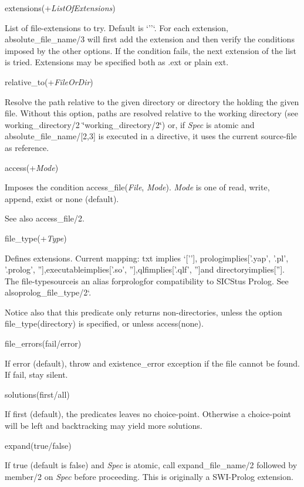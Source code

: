 \begin{DoxyItemize}
\item extensions(+{\itshape List\+Of\+Extensions})

List of file-\/extensions to try. Default is `''`. For each extension, absolute\+\_\+file\+\_\+name/3 will first add the extension and then verify the conditions imposed by the other options. If the condition fails, the next extension of the list is tried. Extensions may be specified both as {\ttfamily .ext} or plain {\ttfamily ext}.
\item relative\+\_\+to(+{\itshape File\+Or\+Dir})

Resolve the path relative to the given directory or directory the holding the given file. Without this option, paths are resolved relative to the working directory (see working\+\_\+directory/2 \char`\"{}working\+\_\+directory/2\char`\"{}) or, if {\itshape Spec} is atomic and {\ttfamily absolute\+\_\+file\+\_\+name/\mbox{[}2,3\mbox{]}} is executed in a directive, it uses the current source-\/file as reference.
\item access(+{\itshape Mode})

Imposes the condition access\+\_\+file({\itshape File}, {\itshape Mode}). {\itshape Mode} is one of {\ttfamily read}, {\ttfamily write}, {\ttfamily append}, {\ttfamily exist} or {\ttfamily none} (default).

See also {\ttfamily access\+\_\+file/2}.
\item file\+\_\+type(+{\itshape Type})

Defines extensions. Current mapping\+: {\ttfamily txt} implies `\mbox{[}''\mbox{]}{\ttfamily , }prolog{\ttfamily implies}\mbox{[}'.yap', '.pl', '.prolog', ''\mbox{]}{\ttfamily ,}executable{\ttfamily  implies}\mbox{[}'.so', ''\mbox{]}{\ttfamily ,}qlf{\ttfamily implies}\mbox{[}'.qlf', ''\mbox{]}{\ttfamily and }directory{\ttfamily implies}\mbox{[}''\mbox{]}{\ttfamily . The file-\/type}source{\ttfamily  is an alias for}prolog{\ttfamily for compatibility to S\+I\+C\+Stus Prolog. See also}prolog\+\_\+file\+\_\+type/2`.

Notice also that this predicate only returns non-\/directories, unless the option {\ttfamily file\+\_\+type(directory)} is specified, or unless {\ttfamily access(none)}.
\item file\+\_\+errors({\ttfamily fail}/{\ttfamily error})

If {\ttfamily error} (default), throw and {\ttfamily existence\+\_\+error} exception if the file cannot be found. If {\ttfamily fail}, stay silent.
\item solutions({\ttfamily first}/{\ttfamily all})

If {\ttfamily first} (default), the predicates leaves no choice-\/point. Otherwise a choice-\/point will be left and backtracking may yield more solutions.
\item expand({\ttfamily true}/{\ttfamily false})

If {\ttfamily true} (default is {\ttfamily false}) and {\itshape Spec} is atomic, call expand\+\_\+file\+\_\+name/2 followed by member/2 on {\itshape Spec} before proceeding. This is originally a S\+W\+I-\/\+Prolog extension.
\end{DoxyItemize}

